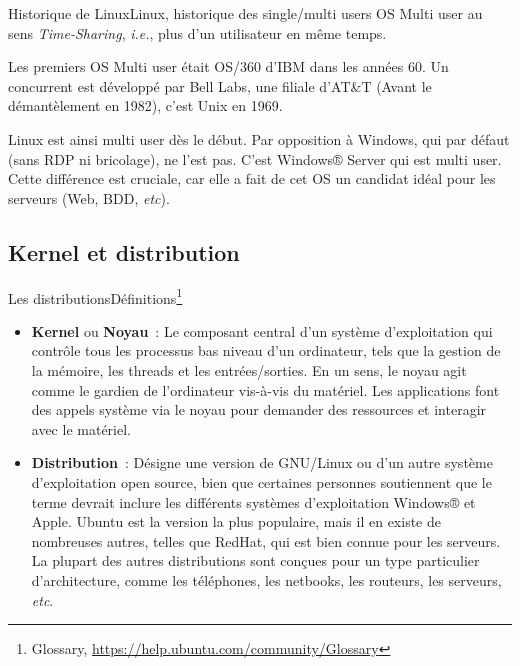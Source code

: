\documentclass{beamer}
\begin{document}
    \begin{frame}{Historique de Linux}{Linux, historique des single/multi users OS}
        Multi user au sens \textit{Time-Sharing}, \textit{i.e.}, plus d'un utilisateur en même temps.

        Les premiers OS Multi user était OS/360 d'IBM dans les années 60.
        Un concurrent est développé par Bell Labs, une filiale d'AT\&T (Avant le démantèlement en 1982), c'est Unix en 1969.

        Linux est ainsi multi user dès le début.
        Par opposition à Windows, qui par défaut (sans RDP ni bricolage), ne l'est pas.
        C'est Windows® Server qui est multi user.
        \bigbreak
        Cette différence est cruciale, car elle a fait de cet OS un candidat idéal pour les serveurs (Web, BDD, \textit{etc}).
    \end{frame}

    \subsection{Kernel et distribution}\label{subsec:kernel-et-distribution}

    \begin{frame}{Les distributions}{Définitions\footnote{Glossary, \url{https://help.ubuntu.com/community/Glossary}}}
        \begin{itemize}
            \item \textbf{Kernel} ou \textbf{Noyau}~: Le composant central d'un système d'exploitation qui contrôle tous les processus bas niveau d'un ordinateur, tels que la gestion de la mémoire, les threads et les entrées/sorties.
            En un sens, le noyau agit comme le gardien de l'ordinateur vis-à-vis du matériel.
            Les applications font des appels système via le noyau pour demander des ressources et interagir avec le matériel.
            \item \textbf{Distribution}~: Désigne une version de GNU/Linux ou d'un autre système d'exploitation open source, bien que certaines personnes soutiennent que le terme devrait inclure les différents systèmes d'exploitation Windows® et Apple.
            Ubuntu est la version la plus populaire, mais il en existe de nombreuses autres, telles que RedHat, qui est bien connue pour les serveurs.
            La plupart des autres distributions sont conçues pour un type particulier d'architecture, comme les téléphones, les netbooks, les routeurs, les serveurs, \textit{etc}.
        \end{itemize}
    \end{frame}
\end{document}
